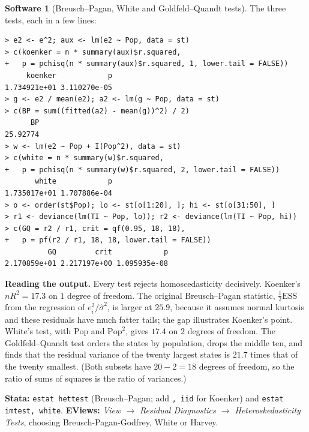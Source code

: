 \documentclass[11pt,a4paper]{article}
\numberwithin{equation}{section}
\theoremstyle{definition}
\newtheorem{software}[thm]{Software}
\begin{document}
\begin{software}[Breusch--Pagan, White and Goldfeld--Quandt tests]
\label{sw:hettests}
The three tests, each in a few lines:
{\small\begin{verbatim}
> e2 <- e^2; aux <- lm(e2 ~ Pop, data = st)
> c(koenker = n * summary(aux)$r.squared,
+   p = pchisq(n * summary(aux)$r.squared, 1, lower.tail = FALSE))
     koenker            p
1.734921e+01 3.110270e-05
> g <- e2 / mean(e2); a2 <- lm(g ~ Pop, data = st)
> c(BP = sum((fitted(a2) - mean(g))^2) / 2)
      BP
25.92774
> w <- lm(e2 ~ Pop + I(Pop^2), data = st)
> c(white = n * summary(w)$r.squared,
+   p = pchisq(n * summary(w)$r.squared, 2, lower.tail = FALSE))
       white            p
1.735017e+01 1.707886e-04
> o <- order(st$Pop); lo <- st[o[1:20], ]; hi <- st[o[31:50], ]
> r1 <- deviance(lm(TI ~ Pop, lo)); r2 <- deviance(lm(TI ~ Pop, hi))
> c(GQ = r2 / r1, crit = qf(0.95, 18, 18),
+   p = pf(r2 / r1, 18, 18, lower.tail = FALSE))
          GQ         crit            p
2.170859e+01 2.217197e+00 1.095935e-08
\end{verbatim}}
\textbf{Reading the output.} Every test rejects homoscedasticity decisively. Koenker's $nR^2 = 17.3$ on $1$ degree of freedom. The original Breusch--Pagan
statistic, $\frac12\text{ESS}$ from the regression of $e_i^2/\hat\sigma^2$, is larger at $25.9$, because it assumes normal kurtosis and these residuals have much fatter tails; the
gap illustrates Koenker's point. White's test, with $\text{Pop}$ and $\text{Pop}^2$, gives $17.4$ on $2$ degrees of freedom. The Goldfeld--Quandt test orders the states by
population, drops the middle ten, and finds that the residual variance of the twenty largest states is $21.7$ times that of the twenty smallest. (Both
subsets have $20 - 2 = 18$ degrees of freedom, so the ratio of sums of squares is the ratio of variances.)

\textbf{Stata:} \texttt{estat hettest} (Breusch--Pagan; add \texttt{, iid} for Koenker) and \texttt{estat imtest, white}. \textbf{EViews:}
\emph{View $\to$ Residual Diagnostics $\to$ Heteroskedasticity Tests}, choosing Breusch-Pagan-Godfrey, White or Harvey.
\end{software}
\end{document}
